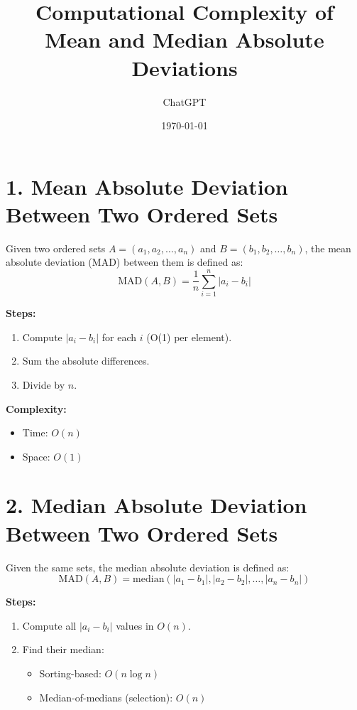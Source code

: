\documentclass{article}
\title{Computational Complexity of Mean and Median Absolute Deviations}
\author{ChatGPT}
\date{\today}
\begin{document}
\maketitle

\section*{1. Mean Absolute Deviation Between Two Ordered Sets}

Given two ordered sets \( A = (a_1, a_2, \dots, a_n) \) and \( B = (b_1, b_2, \dots, b_n) \), the mean absolute deviation (MAD) between them is defined as:
\begin{equation}
\text{MAD}(A, B) = \frac{1}{n} \sum_{i=1}^n |a_i - b_i|
\end{equation}

\textbf{Steps:}
\begin{enumerate}
    \item Compute \( |a_i - b_i| \) for each \( i \) (O(1) per element).
    \item Sum the absolute differences.
    \item Divide by \( n \).
\end{enumerate}

\textbf{Complexity:}
\begin{itemize}
    \item Time: \( O(n) \)
    \item Space: \( O(1) \)
\end{itemize}

\section*{2. Median Absolute Deviation Between Two Ordered Sets}

Given the same sets, the median absolute deviation is defined as:
\begin{equation}
\text{MAD}(A,B) = \text{median}(|a_1 - b_1|, |a_2 - b_2|, \dots, |a_n - b_n|)
\end{equation}

\textbf{Steps:}
\begin{enumerate}
    \item Compute all \( |a_i - b_i| \) values in \( O(n) \).
    \item Find their median:
    \begin{itemize}
        \item Sorting-based: \( O(n \log n) \)
        \item Median-of-medians (selection): \( O(n) \)
    \end{itemize}
\end{enumerate}
\end{document}
